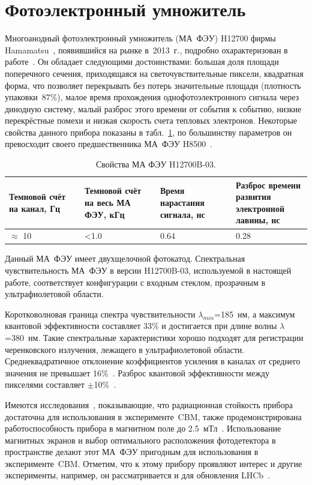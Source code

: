 \section{Фотоэлектронный умножитель}\label{section:secMapmt}

Многоанодный фотоэлектронный умножитель (МА~ФЭУ) H12700 фирмы Hamamatsu~\cite{H12700MANUAL}, появившийся на рынке в~2013~г., подробно охарактеризован в работе~\cite{CALVI}. Он обладает следующими достоинствами: большая доля площади поперечного сечения, приходящаяся на светочувствительные пиксели, квадратная форма, что позволяет перекрывать без потерь значительные площади (плотность упаковки~87\%), малое время прохождения однофотоэлектронного сигнала через динодную систему, малый разброс этого времени от события к событию, низкие перекрёстные помехи и низкая скорость счета тепловых электронов. Некоторые свойства данного прибора показаны в табл.~\ref{tabl:MAPMT}, по большинству параметров он превосходит своего предшественника МА~ФЭУ H8500~\cite{H8500MANUAL}.

\begin{table}[h]
\caption{Свойства МА ФЭУ H12700B-03.}
\label{tabl:MAPMT}
\begin{tabular}{ | p{0.25\linewidth} | p{0.25\linewidth} | p{0.25\linewidth} | p{0.25\linewidth} | }
	\hline
	Темновой счёт на канал, Гц & Темновой счёт на весь МА ФЭУ, кГц & Время нарастания сигнала, нс & Разброс времени развития электронной лавины, нс\\
	\hline
	$ \approx $ 10 & <1.0 & 0.64 & 0.28\\
	\hline
\end{tabular}
\end{table}

Данный МА~ФЭУ имеет двухщелочной фотокатод. Спектральная чувствительность МА~ФЭУ в версии H12700B-03, используемой в настоящей работе, соответствует конфигурации с входным стеклом, прозрачным в ультрафиолетовой области.

Коротковолновая граница спектра чувствительности $ \lambda_{min} $=185~нм, а максимум квантовой эффективности составляет 33\% и достигается при длине волны $ \lambda $=380~нм. Такие спектральные характеристики хорошо подходят для регистрации черенковского излучения, лежащего в ультрафиолетовой области. Среднеквадратичное отклонение коэффициентов усиления в каналах от среднего значения не превышает 16\%~\cite{}. Разброс квантовой эффективности между пикселями составляет $ \pm $10\%~\cite{}.

Имеются исследования~\cite{MAPMTRADHARD}, показывающие, что радиационная стойкость прибора достаточна для использования в эксперименте~CBM, также продемонстрирована работоспособность прибора в магнитном поле до 2.5~мТл~\cite{}. Использование магнитных экранов и выбор оптимального расположения фотодетектора в пространстве делают этот МА~ФЭУ пригодным для использования в эксперименте~CBM. Отметим, что к этому прибору проявляют интерес и другие эксперименты, например, он рассматривается и для обновления LHCb~\cite{}.

